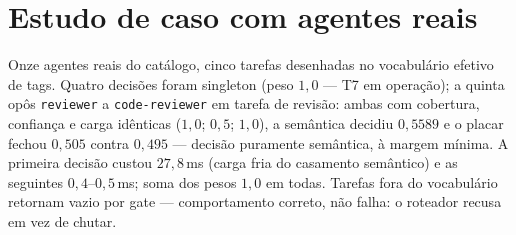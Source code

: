 \section{Estudo de caso com agentes reais}
Onze agentes reais do catálogo, cinco tarefas desenhadas no vocabulário efetivo de tags. Quatro decisões foram singleton (peso $1{,}0$ --- T7 em operação); a quinta opôs \texttt{reviewer} a \texttt{code-reviewer} em tarefa de revisão: ambas com cobertura, confiança e carga idênticas ($1{,}0$; $0{,}5$; $1{,}0$), a semântica decidiu $0{,}5589$ e o placar fechou $0{,}505$ contra $0{,}495$ --- decisão puramente semântica, à margem mínima. A primeira decisão custou $27{,}8$\,ms (carga fria do casamento semântico) e as seguintes $0{,}4$--$0{,}5$\,ms; soma dos pesos $1{,}0$ em todas. Tarefas fora do vocabulário retornam vazio por gate --- comportamento correto, não falha: o roteador recusa em vez de chutar.
